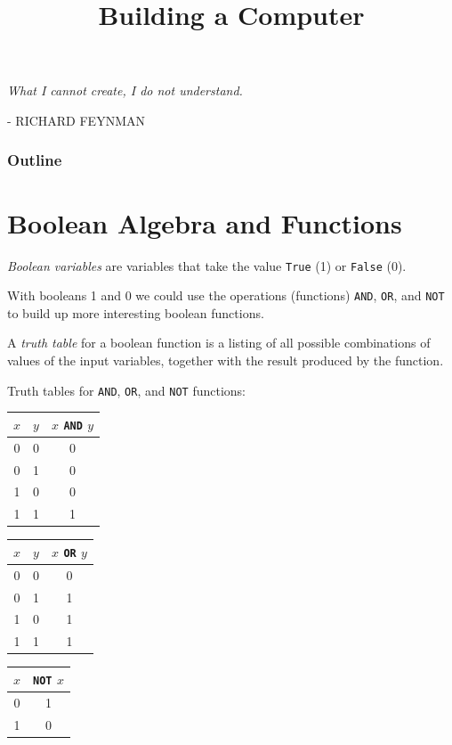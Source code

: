 \documentclass[8pt,a4paper,compress,handout]{beamer}
\title{Building a Computer}
\date{}
\begin{document}
\begin{frame}
\hfill
\begin{minipage}{150pt}
\begin{flushright}
\tiny \emph{What I cannot create, I do not understand.} 

\smallskip

- RICHARD FEYNMAN
\end{flushright}
\end{minipage}
\vfill
\titlepage
\end{frame}

\begin{frame}
\frametitle{Outline}
\tableofcontents
\end{frame}

\section{Boolean Algebra and Functions}
\begin{frame}[fragile]
\emph{Boolean variables} are variables that take the value \lstinline{True} (1) or \lstinline{False} (0).

\bigskip

With booleans 1 and 0 we could use the operations (functions) \lstinline{AND}, \lstinline{OR}, and \lstinline{NOT} to build up more interesting boolean functions.

\bigskip

A \emph{truth table} for a boolean function is a listing of all possible combinations of values of the input variables, together with the result produced by the function.

\bigskip

Truth tables for \lstinline{AND}, \lstinline{OR}, and \lstinline{NOT} functions:

\begin{center}
\begin{tabular}{cc|c}
$x$ & $y$ & $x$ \lstinline$AND$ $y$ \\ \hline
0 & 0 & 0 \\
0 & 1 & 0 \\
1 & 0 & 0 \\
1 & 1 & 1
\end{tabular}\hspace{1cm} \begin{tabular}{cc|c}
$x$ & $y$ & $x$ \lstinline$OR$ $y$ \\ \hline
0 & 0 & 0 \\
0 & 1 & 1 \\
1 & 0 & 1 \\
1 & 1 & 1
\end{tabular}\hspace{1cm} \begin{tabular}{c|c}
$x$ & \lstinline$NOT$ $x$ \\ \hline
0 & 1 \\
1 & 0
\end{tabular}
\end{center}
\end{frame}
\end{document}
